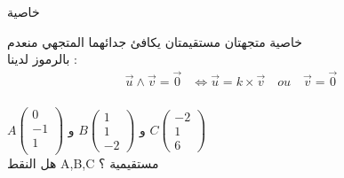 \begin{frame}{خاصية}
	\begin{block}{خاصية}
			متجهتان مستقيمتان  يكافئ جدائهما المتجهي منعدم \\ بالرموز لدينا : \\
		\begin{align*}
		 \vec{u} \land \vec{v}=\vec{0} &\iff   \vec{u}=k \times \vec{v} \quad ou \quad \vec{v} =\vec{0}  \\
		\end{align*}
	\end{block}
\end{frame}
\begin{frame}[label=ex2]%
	\begin{exo}
	
		 $ A\begin{pmatrix}0\\-1\\1\\	\end{pmatrix} $
		و
		$ B \begin{pmatrix}1\\1\\-2	\end{pmatrix} $
		و
		$ C \begin{pmatrix}-2\\1\\6	\end{pmatrix} $
		\\
		  	هل النقط A,B,C  مستقيمية ؟
		  	\\
		  \hyperlink{sol2}{}
	\end{exo}
\end{frame}
